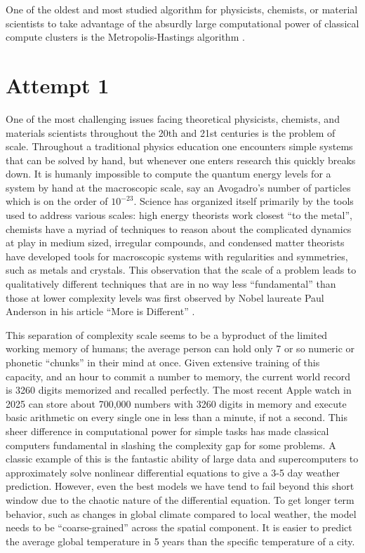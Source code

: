 One of the oldest and most studied algorithm for physicists, chemists, or material scientists to take advantage of the absurdly large computational power of classical compute clusters is the Metropolis-Hastings algorithm \cite{metropolis1953equation}. 

\section{Attempt 1}

One of the most challenging issues facing theoretical physicists, chemists, and materials scientists throughout the 20th and 21st centuries is the problem of scale. Throughout a traditional physics education one encounters simple systems that can be solved by hand, but whenever one enters research this quickly breaks down. It is humanly impossible to compute the quantum energy levels for a system by hand at the macroscopic scale, say an Avogadro's number of particles which is on the order of $10^{-23}$. Science has organized itself primarily by the tools used to address various scales: high energy theorists work closest ``to the metal'', chemists have a myriad of techniques to reason about the complicated dynamics at play in medium sized, irregular compounds, and condensed matter theorists have developed tools for macroscopic systems with regularities and symmetries, such as metals and crystals. This observation that the scale of a problem leads to qualitatively different techniques that are in no way less ``fundamental'' than those at lower complexity levels was first observed by Nobel laureate Paul Anderson in his article ``More is Different'' \cite{moreIsDifferent}.

This separation of complexity scale seems to be a byproduct of the limited working memory of humans; the average person can hold only 7 or so numeric or phonetic ``chunks'' in their mind at once. Given extensive training of this capacity, and an hour to commit a number to memory, the current world record is 3260 digits memorized and recalled perfectly. The most recent Apple watch in 2025 can store about 700,000 numbers with 3260 digits in memory and execute basic arithmetic on every single one in less than a minute, if not a second.
This sheer difference in computational power for simple tasks has made classical computers fundamental in slashing the complexity gap for some problems. A classic example of this is the fantastic ability of large data and supercomputers to approximately solve nonlinear differential equations to give a 3-5 day weather prediction. However, even the best models we have tend to fail beyond this short window due to the chaotic nature of the differential equation. To get longer term behavior, such as changes in global climate compared to local weather, the model needs to be ``coarse-grained'' across the spatial component. It is easier to predict the average global temperature in 5 years than the specific temperature of a city. 

